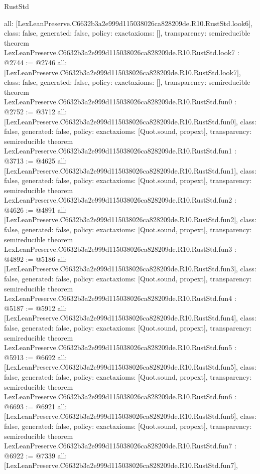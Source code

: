 \begin{lexlean}{RustStd}
\begin{coremodule}
{  all: [LexLeanPreserve.C6632b3a2e999d115038026ca828209de.R10.RustStd.look6],
  class: false,
  generated: false,
  policy: exact{axioms: []},
  transparency: semireducible
}
theorem LexLeanPreserve.C6632b3a2e999d115038026ca828209de.R10.RustStd.look7 : @2744 := @2746 {
  all: [LexLeanPreserve.C6632b3a2e999d115038026ca828209de.R10.RustStd.look7],
  class: false,
  generated: false,
  policy: exact{axioms: []},
  transparency: semireducible
}
theorem LexLeanPreserve.C6632b3a2e999d115038026ca828209de.R10.RustStd.fun0 : @2752 := @3712 {
  all: [LexLeanPreserve.C6632b3a2e999d115038026ca828209de.R10.RustStd.fun0],
  class: false,
  generated: false,
  policy: exact{axioms: [Quot.sound, propext]},
  transparency: semireducible
}
theorem LexLeanPreserve.C6632b3a2e999d115038026ca828209de.R10.RustStd.fun1 : @3713 := @4625 {
  all: [LexLeanPreserve.C6632b3a2e999d115038026ca828209de.R10.RustStd.fun1],
  class: false,
  generated: false,
  policy: exact{axioms: [Quot.sound, propext]},
  transparency: semireducible
}
theorem LexLeanPreserve.C6632b3a2e999d115038026ca828209de.R10.RustStd.fun2 : @4626 := @4891 {
  all: [LexLeanPreserve.C6632b3a2e999d115038026ca828209de.R10.RustStd.fun2],
  class: false,
  generated: false,
  policy: exact{axioms: [Quot.sound, propext]},
  transparency: semireducible
}
theorem LexLeanPreserve.C6632b3a2e999d115038026ca828209de.R10.RustStd.fun3 : @4892 := @5186 {
  all: [LexLeanPreserve.C6632b3a2e999d115038026ca828209de.R10.RustStd.fun3],
  class: false,
  generated: false,
  policy: exact{axioms: [Quot.sound, propext]},
  transparency: semireducible
}
theorem LexLeanPreserve.C6632b3a2e999d115038026ca828209de.R10.RustStd.fun4 : @5187 := @5912 {
  all: [LexLeanPreserve.C6632b3a2e999d115038026ca828209de.R10.RustStd.fun4],
  class: false,
  generated: false,
  policy: exact{axioms: [Quot.sound, propext]},
  transparency: semireducible
}
theorem LexLeanPreserve.C6632b3a2e999d115038026ca828209de.R10.RustStd.fun5 : @5913 := @6692 {
  all: [LexLeanPreserve.C6632b3a2e999d115038026ca828209de.R10.RustStd.fun5],
  class: false,
  generated: false,
  policy: exact{axioms: [Quot.sound, propext]},
  transparency: semireducible
}
theorem LexLeanPreserve.C6632b3a2e999d115038026ca828209de.R10.RustStd.fun6 : @6693 := @6921 {
  all: [LexLeanPreserve.C6632b3a2e999d115038026ca828209de.R10.RustStd.fun6],
  class: false,
  generated: false,
  policy: exact{axioms: [Quot.sound, propext]},
  transparency: semireducible
}
theorem LexLeanPreserve.C6632b3a2e999d115038026ca828209de.R10.RustStd.fun7 : @6922 := @7339 {
  all: [LexLeanPreserve.C6632b3a2e999d115038026ca828209de.R10.RustStd.fun7],
}
\end{coremodule}
\end{lexlean}
